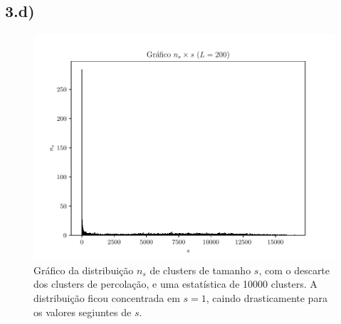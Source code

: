 \documentclass[a4paper, brazil]{article}
\begin{document}
\newpage
\subsection{3.d)}

\begin{figure}[ht]
    \centering
    \includegraphics[width=\textwidth]{fig_3d.pdf}
    \caption{Gráfico da distribuição \( n_s \) de clusters de tamanho \( s \), com o descarte dos clusters de percolação, e uma estatística de 10000 clusters.
    A distribuição ficou concentrada em \( s = 1\), caindo drasticamente para os valores segiuntes de \( s \).}\label{fig3d}
    \end{figure}
\end{document}
